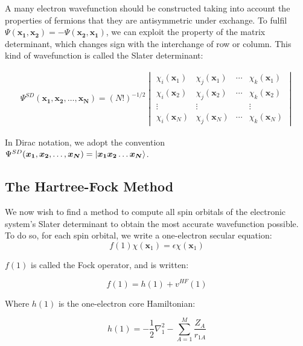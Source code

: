 A many electron wavefunction should be constructed taking into account the properties of fermions that they are antisymmetric under exchange. To fulfil $\Psi(\bm{x_1},\bm{x_2}) = - \Psi(\bm{x_2},\bm{x_1})$, we can exploit the property of the matrix determinant, which changes sign with the interchange of row or column. This kind of wavefunction is called the Slater determinant:\cite{Slater1929}

\begin{gather}
    \Psi^{SD}(\bm{x_1},\bm{x_2},\ldots,\bm{x_N}) 
    = (N!)^{-1/2}
      \begin{vmatrix}
   \chi_i(\bm{x}_1) & \chi_j(\bm{x}_1) & \dotsm & \chi_k(\bm{x}_1) \\
   \chi_i(\bm{x}_2) & \chi_j(\bm{x}_2) & \dotsm & \chi_k(\bm{x}_2) \\
   \vdots           & \vdots           &        & \vdots           \\
   \chi_i(\bm{x}_N) & \chi_j(\bm{x}_N) & \dotsm & \chi_k(\bm{x}_N) 
   \end{vmatrix}
\end{gather}

In Dirac notation, we adopt the convention $\Psi^{SD}(\bm{x_1},\bm{x_2},\ldots,\bm{x_N}) = \ket{\bm{x_1}\bm{x_2}\ldots\bm{x_N}}$.


\subsection{The Hartree-Fock Method}
We now wish to find a method to compute all spin orbitals of the electronic system's Slater determinant to obtain the most accurate wavefunction possible. To do so, for each spin orbital, we write a one-electron secular equation:
\begin{equation}
    f(1)\chi(\bm{x}_1) = \epsilon  \chi(\bm{x}_1)
    \label{eq:one_electron_HF}
\end{equation}
    
$f(1)$ is called the Fock operator, and is written:

\begin{equation}
    f(1) = h(1) + v^{HF}(1)
\end{equation}{}

Where $h(1)$ is the one-electron core Hamiltonian:

\begin{equation}
    h(1) = - \frac{1}{2} \nabla^2_1 - \sum_{A=1}^M \frac{Z_A}{r_{1A}}
\end{equation}{}

